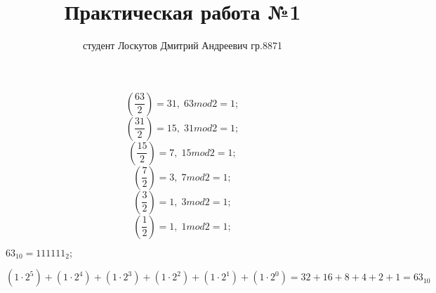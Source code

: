 \documentclass[a4paper,11pt]{article}
\title{Практическая работа №1}
\author{студент Лоскутов Дмитрий Андреевич гр.8871}
\begin{document}
\maketitle
$$\left(\frac{63}{2}\right)=31, \; 63mod2=1;$$
$$\left(\frac{31}{2}\right)=15, \; 31mod2=1;$$
$$\left(\frac{15}{2}\right)=7, \; 15mod2=1;$$
$$\left(\frac{7}{2}\right)=3, \; 7mod2=1;$$
$$\left(\frac{3}{2}\right)=1, \; 3mod2=1;$$
$$\left(\frac{1}{2}\right)=1, \; 1mod2=1;$$

$63_{10}=111111_2;$

$$(1\cdot2^5)+(1\cdot2^4)+(1\cdot2^3)+(1\cdot2^2)+(1\cdot2^1)+(1\cdot2^0)=32+16+8+4+2+1=63_{10}$$
\end{document}
